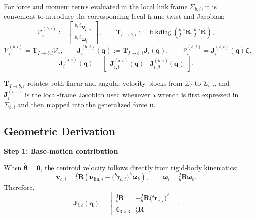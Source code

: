 \documentclass[12pt,a4paper]{report}
\newcommand{\newsymbols}[1]{\par\noindent{}#1\par\vspace{0.35em}}
\newcommand{\Frame}[1]{\Sigma_{#1}}
\begin{document}
For force and moment terms evaluated in the local link frame $\Frame{b,i}$, it is convenient to introduce the corresponding local-frame twist and Jacobian:
\begin{equation}
\mathcal{V}_i^{(b,i)}
:=
\begin{bmatrix}
{}^{b,i}\mathbf{v}_{c,i} \\
{}^{b,i}\boldsymbol{\omega}_{i}
\end{bmatrix},
\qquad
\mathbf{T}_{I\rightarrow b,i}
:=
\operatorname{blkdiag}\!\left({}_{I}^{b,i}\mathbf{R}, {}_{I}^{b,i}\mathbf{R}\right),
\end{equation}
\begin{equation}
\mathcal{V}_i^{(b,i)} = \mathbf{T}_{I\rightarrow b,i}\mathcal{V}_i,
\qquad
\mathbf{J}_i^{(b,i)}(\mathbf{q}) := \mathbf{T}_{I\rightarrow b,i}\mathbf{J}_i(\mathbf{q}),
\qquad
\mathcal{V}_i^{(b,i)} = \mathbf{J}_i^{(b,i)}(\mathbf{q})\boldsymbol{\zeta}.
\end{equation}
\begin{equation}
\mathbf{J}_i^{(b,i)}(\mathbf{q}) =
\begin{bmatrix}
\mathbf{J}_{i,b}^{(b,i)}(\mathbf{q}) &
\mathbf{J}_{i,\theta}^{(b,i)}(\mathbf{q})
\end{bmatrix}.
\end{equation}
\newsymbols{$\mathbf{T}_{I\rightarrow b,i}$ rotates both linear and angular velocity blocks from $\Frame{I}$ to $\Frame{b,i}$, and $\mathbf{J}_i^{(b,i)}$ is the local-frame Jacobian used whenever a wrench is first expressed in $\Frame{b,i}$ and then mapped into the generalized force $\mathbf{u}$.}

\subsection{Geometric Derivation}

\textbf{Step 1: Base-motion contribution}

When $\dot{\boldsymbol{\theta}}=\mathbf{0}$, the centroid velocity follows directly from rigid-body kinematics:
\begin{equation}
\mathbf{v}_{c,i}
=
{}_{b}^{I}\mathbf{R}
\left(
\boldsymbol{\nu}_{\mathrm{lin},b}
- \bigl({}^{b}\mathbf{r}_{c,i}\bigr)^\wedge \boldsymbol{\omega}_b
\right),
\qquad
\boldsymbol{\omega}_i = {}_{b}^{I}\mathbf{R}\boldsymbol{\omega}_b.
\end{equation}
Therefore,
\begin{equation}
\mathbf{J}_{i,b}(\mathbf{q})
=
\begin{bmatrix}
{}_{b}^{I}\mathbf{R} & -{}_{b}^{I}\mathbf{R}\bigl({}^{b}\mathbf{r}_{c,i}\bigr)^\wedge \\
\mathbf{0}_{3\times3} & {}_{b}^{I}\mathbf{R}
\end{bmatrix}.
\end{equation}
\end{document}
